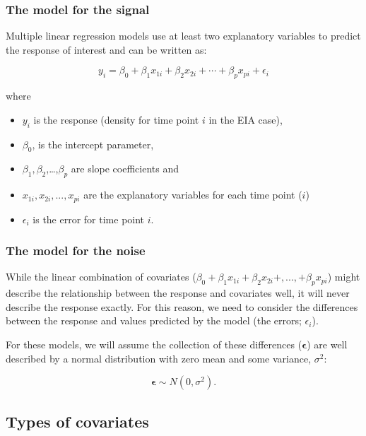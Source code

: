 \documentclass[
  oneside]{krantz}
\providecommand{\tightlist}{%
  \setlength{\itemsep}{0pt}\setlength{\parskip}{0pt}}
\begin{document}
\hypertarget{the-model-for-the-signal}{%
\subsubsection{The model for the signal}\label{the-model-for-the-signal}}

Multiple linear regression models use at least two explanatory variables to predict the response of interest and can be written as:

\[
y_{i} =  \beta_0 +
\beta_1x_{1i} + \beta_2x_{2i} + \cdots +\beta_px_{pi} +\epsilon_{i}
\label{eq:lreg}
\]

where

\begin{itemize}
\tightlist
\item
  \(y_{i}\) is the response (density for time point \(i\) in the EIA case),
\item
  \(\beta_0\), is the intercept parameter,
\item
  \(\beta_1,\beta_2\),\ldots,\(\beta_p\) are slope coefficients and
\item
  \(x_{1i}, x_{2i},...,x_{pi}\) are the explanatory variables for each time point (\(i\))
\item
  \(\epsilon_i\) is the error for time point \(i\).
\end{itemize}

\hypertarget{the-model-for-the-noise}{%
\subsubsection{The model for the noise}\label{the-model-for-the-noise}}

While the linear combination of covariates (\(\beta_0 + \beta_1x_{1i} + \beta_2x_{2i} +,...,+\beta_px_{pi}\)) might describe the relationship between the response and covariates well, it will never describe the response exactly. For this reason, we need to consider the differences between the response and values predicted by the model (the errors; \(\epsilon_{i}\)).

For these models, we will assume the collection of these differences (\(\boldsymbol{\epsilon}\)) are well described by a normal distribution with zero mean and some variance, \(\sigma^2\):

\begin{equation}
\boldsymbol{\epsilon} \sim N(0,\sigma^2).
\end{equation}

\hypertarget{types-of-covariates}{%
\subsection{Types of covariates}\label{types-of-covariates}}
\end{document}
